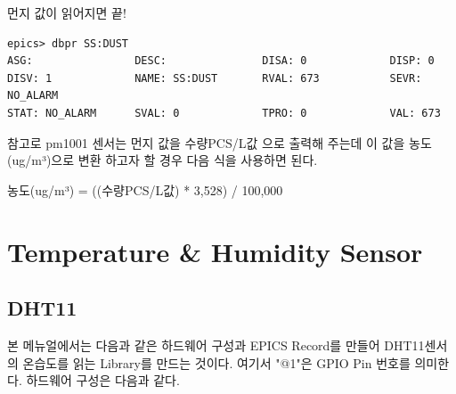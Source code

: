 \documentclass[11pt
  , a4paper
  , article
  , oneside
]{memoir}
\begin{document}
먼지 값이 읽어지면 끝!
\begin{lstlisting}[style=termstyle]
epics> dbpr SS:DUST
ASG:                DESC:               DISA: 0             DISP: 0             
DISV: 1             NAME: SS:DUST       RVAL: 673           SEVR: NO_ALARM      
STAT: NO_ALARM      SVAL: 0             TPRO: 0             VAL: 673
\end{lstlisting}
참고로 pm1001 센서는 먼지 값을 수량PCS/L값 으로 출력해 주는데 이 값을 농도(ug/m³)으로 변환 하고자 할 경우 다음 식을 사용하면 된다.

        농도(ug/m³) = ((수량PCS/L값) * 3,528) / 100,000

\section{Temperature \& Humidity Sensor}
\subsection{DHT11}
본 메뉴얼에서는 다음과 같은 하드웨어 구성과 EPICS Record를 만들어 DHT11센서의 온습도를 읽는 Library를 
만드는 것이다. 여기서 "@1"은 GPIO Pin 번호를 의미한다.
하드웨어 구성은 다음과 같다.
\end{document}

